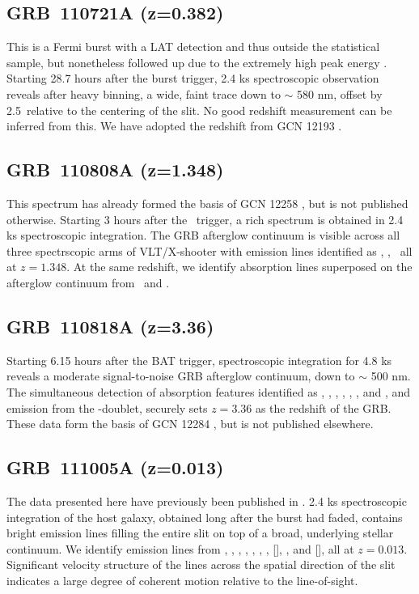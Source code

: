 \documentclass[longauth]{aa}    %
\begin{document}
\subsection{GRB~110721A (z=0.382)} \label{110721}

This is a Fermi burst with a LAT detection and thus outside the statistical
sample, but nonetheless followed up due to the extremely high peak energy
\citep{Axelsson2012}. Starting 28.7 hours after the burst trigger, 2.4 ks
spectroscopic observation reveals after heavy binning, a wide, faint trace down
to $\sim$ 580 nm, offset by 2.5\arcsec~relative to the centering of the slit.
No good redshift measurement can be inferred from this. We have adopted the
redshift from GCN 12193 \citep{GCN12193}.


\subsection{GRB~110808A (z=1.348)} \label{110808}

This spectrum has already formed the basis of GCN 12258 \citep{GCN12258}, but is
not published otherwise. Starting 3 hours after the \swift~trigger, a rich
spectrum is obtained in 2.4 ks spectroscopic integration. The GRB afterglow
continuum is visible across all three spectrscopic arms of VLT/X-shooter with
emission lines identified as \oii, \oiii, \ha~all at $z = 1.348$. At the same
redshift, we identify absorption lines superposed on the afterglow continuum
from \mgii~and \feii.

\subsection{GRB~110818A (z=3.36)} \label{110818}

Starting 6.15 hours after the BAT trigger, spectroscopic integration for 4.8 ks
reveals a moderate signal-to-noise GRB afterglow continuum, down to $\sim$ 500 nm. The simultaneous detection of absorption features identified as \lya,
\SIii, \civ, \alii, \cah, \cak, and \mgii, and emission from the \oiii-doublet,
securely sets $z = 3.36$ as the redshift of the GRB. These data form the basis
of GCN 12284 \citep{GCN12284}, but is not published elsewhere.

\subsection{GRB~111005A (z=0.013)} \label{111005}

The data presented here have previously been published in \citet{Michaowski2016}.
2.4 ks spectroscopic integration of the host galaxy, obtained long after the
burst had faded, contains bright emission lines filling the entire slit on top
of a broad, underlying stellar continuum. We identify emission lines from \oii,
\hd, \hg, \hb, \oiii, \nii, \hb, [\sii], \ariii, and [\siii], all at $z=0.013$.
Significant velocity structure of the lines across the spatial direction of the
slit indicates a large degree of coherent motion relative to the line-of-sight.
\end{document}
